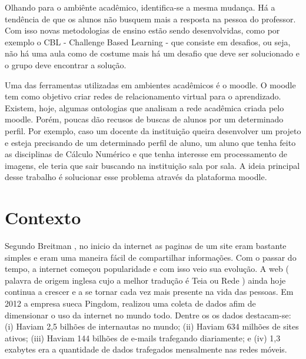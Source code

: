Olhando para o ambiênte acadêmico, identifica-se a mesma mudança. Há a tendência de que os alunos não busquem mais a resposta na pessoa do professor. Com isso novas metodologias de ensino estão sendo desenvolvidas, como por exemplo o CBL - Challenge Based Learning - que consiste em desafios, ou seja, não há uma aula como de costume mais há um desafio que deve ser solucionado e o grupo deve encontrar a solução\cite{CBL}.

Uma das ferramentas utilizadas em ambientes acadêmicos é o moodle. O moodle tem como objetivo criar redes de relacionamento virtual para o aprendizado. Existem, hoje, algumas ontologias que analisam a rede acadêmica criada pelo moodle. Porém, poucas dão recusos de buscas de alunos por um determinado perfil. Por exemplo, caso um docente da instituição queira desenvolver um projeto e esteja precisando de um determinado perfil de aluno, um aluno que tenha feito as disciplinas de Cálculo Numérico e que tenha interesse em processamento de imagens, ele teria que sair buscando na instituição sala por sala. A ideia principal desse trabalho é solucionar esse problema através da plataforma moodle.

\section{Contexto}

Segundo Breitman \cite{BK}, no inicio da internet as paginas de um site eram bastante simples e eram uma maneira fácil de compartilhar informações. Com o passar do tempo, a internet começou popularidade e com isso veio sua evolução. A web ( palavra de origem inglesa cujo a melhor tradução é Teia ou Rede ) ainda hoje continua a crescer e a se tornar cada vez mais presente na vida das pessoas.  Em 2012 a empresa sueca Pingdom, realizou uma coleta de dados afim de dimensionar o uso da internet no mundo todo. Dentre os os dados destacam-se: (i) Haviam 2,5 bilhões de internautas no mundo; (ii) Haviam 634 milhões de sites ativos; (iii) Haviam 144 bilhões de e-mails trafegando diariamente;  e (iv) 1,3 exabytes era a quantidade de dados trafegados mensalmente nas redes móveis.   

